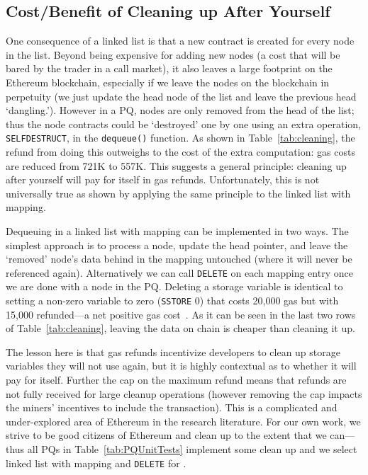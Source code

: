
\subsection{Cost/Benefit of Cleaning up After Yourself}
\label{sec:gasrefund}



One consequence of a linked list is that a new contract is created for every node in the list. Beyond being expensive for adding new nodes (a cost that will be bared by the trader in a call market), it also leaves a large footprint on the Ethereum blockchain, especially if we leave the nodes on the blockchain in perpetuity (\ie we just update the head node of the list and leave the previous head `dangling.'). However in a PQ, nodes are only removed from the head of the list; thus the node contracts could be `destroyed' one by one using an extra operation, \texttt{SELFDESTRUCT}, in the \texttt{dequeue()} function. As shown in Table~\ref{tab:cleaning}, the refund from doing this outweighs to the cost of the extra computation: gas costs are reduced from 721K to 557K.  This suggests a general principle: cleaning up after yourself will pay for itself in gas refunds. Unfortunately, this is not universally true as shown by applying the same principle to the linked list with mapping. 

Dequeuing in a linked list with mapping can be implemented in two ways. The simplest approach is to process a node, update the head pointer, and leave the `removed' node's data behind in the mapping untouched (where it will never be referenced again). Alternatively we can call \texttt{DELETE} on each mapping entry once we are done with a node in the PQ. Deleting a storage variable is identical to setting a non-zero variable to zero (\texttt{SSTORE} 0) that costs 20,000 gas but with 15,000 refunded---a net positive gas cost~\cite{wood2014ethereum}. As it can be seen in the last two rows of Table~\ref{tab:cleaning}, leaving the data on chain is cheaper than cleaning it up.

The lesson here is that gas refunds incentivize developers to clean up storage variables they will not use again, but it is highly contextual as to whether it will pay for itself. Further the cap on the maximum refund means that refunds are not fully received for large cleanup operations (however removing the cap impacts the miners' incentives to include the transaction). This is a complicated and under-explored area of Ethereum in the research literature. For our own work, we strive to be good citizens of Ethereum and clean up to the extent that we can---thus all PQs in Table~\ref{tab:PQUnitTests} implement some clean up and we select linked list with mapping and \texttt{DELETE} for \cm.



